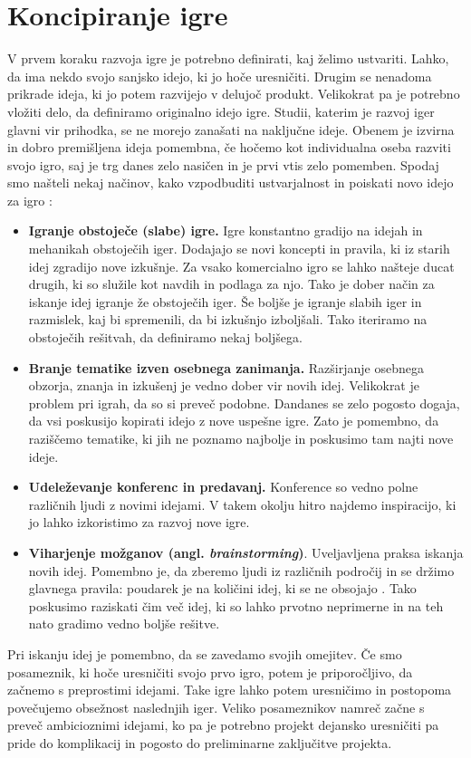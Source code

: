 \documentclass[12pt,a4paper,twoside]{book}
\begin{document}
\section{Koncipiranje igre}
V prvem koraku razvoja igre je potrebno definirati, kaj želimo ustvariti. Lahko, da ima nekdo svojo sanjsko idejo, ki jo hoče uresničiti. Drugim se nenadoma prikrade ideja, ki jo potem razvijejo v delujoč produkt. Velikokrat pa je potrebno vložiti delo, da definiramo originalno idejo igre. Studii, katerim je razvoj iger glavni vir prihodka, se ne morejo zanašati na naključne ideje. Obenem je izvirna in dobro premišljena ideja pomembna, če hočemo kot individualna oseba razviti svojo igro, saj je trg danes zelo nasičen in je prvi vtis zelo pomemben. Spodaj smo našteli nekaj načinov, kako vzpodbuditi ustvarjalnost in poiskati novo idejo za igro \cite{rogers2014level}: 
\begin{itemize}
	\item \textbf{Igranje obstoječe (slabe) igre.} Igre konstantno gradijo na idejah in mehanikah obstoječih iger. Dodajajo se novi koncepti in pravila, ki iz starih idej zgradijo nove izkušnje. Za vsako komercialno igro se lahko našteje ducat drugih, ki so služile kot navdih in podlaga za njo. Tako je dober način za iskanje idej igranje že obstoječih iger. Še boljše je igranje slabih iger in razmislek, kaj bi spremenili, da bi izkušnjo izboljšali. Tako iteriramo na obstoječih rešitvah, da definiramo nekaj boljšega.
	\item \textbf{Branje tematike izven osebnega zanimanja.} Razširjanje osebnega obzorja, znanja in izkušenj je vedno dober vir novih idej. Velikokrat je problem pri igrah, da so si preveč podobne. Dandanes se zelo pogosto dogaja, da vsi poskusijo kopirati idejo z nove uspešne igre. Zato je pomembno, da raziščemo tematike, ki jih ne poznamo najbolje in poskusimo tam najti nove ideje.
	\item \textbf{Udeleževanje konferenc in predavanj.} Konference so vedno polne različnih ljudi z novimi idejami. V takem okolju hitro najdemo inspiracijo, ki jo lahko izkoristimo za razvoj nove igre.
	\item \textbf{Viharjenje možganov (angl. \textit{brainstorming})}. Uveljavljena praksa iskanja novih idej. Pomembno je, da zberemo ljudi iz različnih področij in se držimo glavnega pravila: poudarek je na količini idej, ki se ne obsojajo \cite{osborn1953applied}. Tako poskusimo raziskati čim več idej, ki so lahko prvotno neprimerne in na teh nato gradimo vedno boljše rešitve.
\end{itemize}
Pri iskanju idej je pomembno, da se zavedamo svojih omejitev. Če smo posameznik, ki hoče uresničiti svojo prvo igro, potem je priporočljivo, da začnemo s preprostimi idejami. Take igre lahko potem uresničimo in postopoma povečujemo obsežnost naslednjih iger. Veliko posameznikov namreč začne s preveč ambicioznimi idejami, ko pa je potrebno projekt dejansko uresničiti pa pride do komplikacij in pogosto do preliminarne zaključitve projekta.
\end{document}
